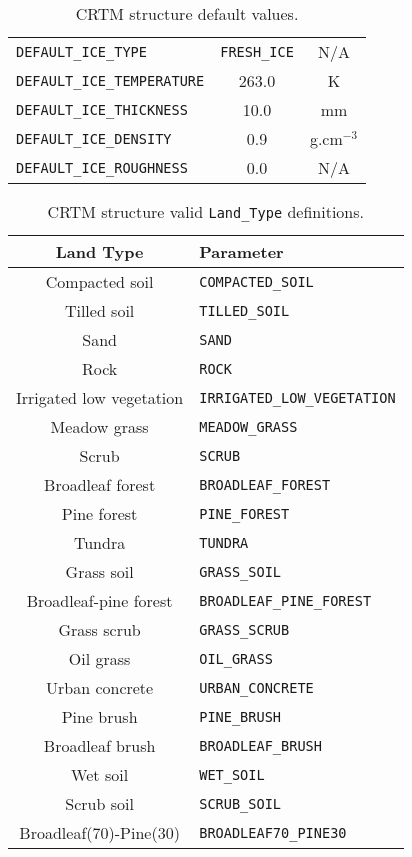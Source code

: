 \begin{table}[htp]
\begin{tabular}{l c c}
    \hline
    \texttt{DEFAULT\_ICE\_TYPE}               & \texttt{FRESH\_ICE} & N/A\\
    \texttt{DEFAULT\_ICE\_TEMPERATURE}        & 263.0      & K\\
    \texttt{DEFAULT\_ICE\_THICKNESS}          & 10.0       & mm\\
    \texttt{DEFAULT\_ICE\_DENSITY}            & 0.9        & g.cm$^{-3}$\\
    \texttt{DEFAULT\_ICE\_ROUGHNESS}          & 0.0        & N/A\\
    \hline
  \end{tabular}
  \caption{CRTM \Surface{} structure default values.}
  \label{tab:surface_default}
\end{table}

\begin{table}[htp]
  \centering
  \begin{tabular}{c l}
    \hline
    \sffamily\textbf{Land Type} & \sffamily\textbf{Parameter} \\
    \hline\hline
          Compacted soil      & \texttt{COMPACTED\_SOIL} \\
            Tilled soil       & \texttt{TILLED\_SOIL} \\
              Sand            & \texttt{SAND} \\
              Rock            & \texttt{ROCK} \\
     Irrigated low vegetation & \texttt{IRRIGATED\_LOW\_VEGETATION} \\
           Meadow grass       & \texttt{MEADOW\_GRASS} \\
              Scrub           & \texttt{SCRUB} \\
         Broadleaf forest     & \texttt{BROADLEAF\_FOREST} \\
           Pine forest        & \texttt{PINE\_FOREST} \\
             Tundra           & \texttt{TUNDRA} \\
           Grass soil         & \texttt{GRASS\_SOIL} \\
       Broadleaf-pine forest  & \texttt{BROADLEAF\_PINE\_FOREST} \\
           Grass scrub        & \texttt{GRASS\_SCRUB} \\
            Oil grass         & \texttt{OIL\_GRASS} \\
          Urban concrete      & \texttt{URBAN\_CONCRETE} \\
            Pine brush        & \texttt{PINE\_BRUSH} \\
          Broadleaf brush     & \texttt{BROADLEAF\_BRUSH} \\
             Wet soil         & \texttt{WET\_SOIL} \\
            Scrub soil        & \texttt{SCRUB\_SOIL} \\
      Broadleaf(70)-Pine(30)  & \texttt{BROADLEAF70\_PINE30} \\
    \hline
  \end{tabular}
  \caption{CRTM \Surface{} structure valid \texttt{Land\_Type} definitions.}
  \label{tab:surface_land_type}
\end{table}

